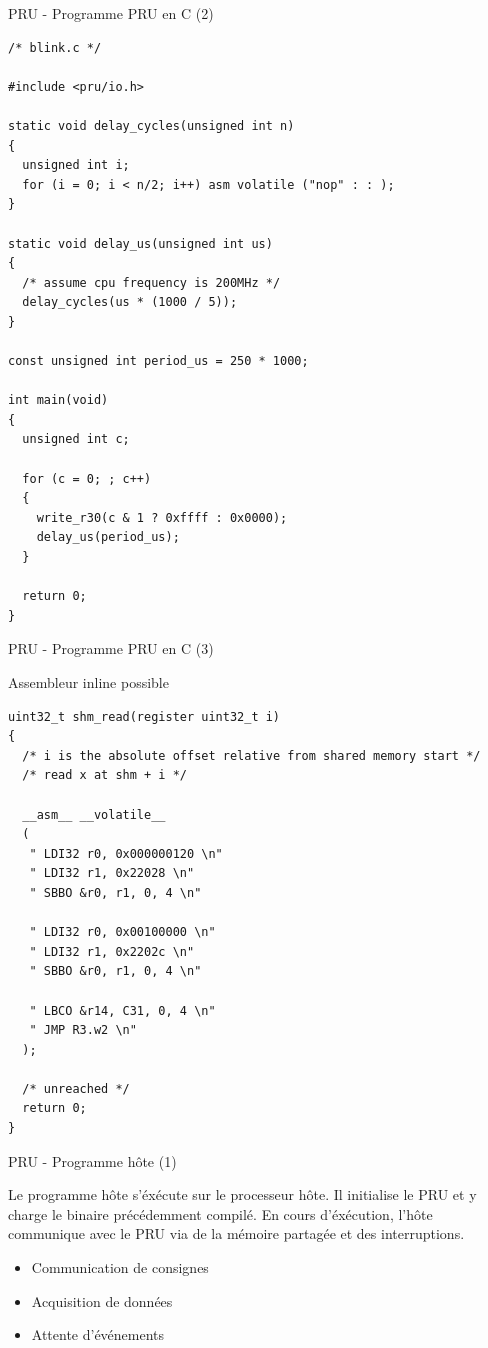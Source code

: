 \documentclass{beamer}
\begin{document}
\begin{frame}[containsverbatim]{PRU - Programme PRU en C (2)}
 \begin{tiny}
   \lstset{language=C++}
   \begin{lstlisting}[frame=tb]
/* blink.c */

#include <pru/io.h>

static void delay_cycles(unsigned int n)
{
  unsigned int i;
  for (i = 0; i < n/2; i++) asm volatile ("nop" : : );
}

static void delay_us(unsigned int us)
{
  /* assume cpu frequency is 200MHz */
  delay_cycles(us * (1000 / 5));
}

const unsigned int period_us = 250 * 1000;

int main(void)
{
  unsigned int c;

  for (c = 0; ; c++)
  {
    write_r30(c & 1 ? 0xffff : 0x0000);
    delay_us(period_us);
  }

  return 0;
}
 \end{lstlisting}
 \end{tiny}
\end{frame}


\begin{frame}[containsverbatim]{PRU - Programme PRU en C (3)}
 \begin{tiny}
   Assembleur inline possible
   \lstset{language=C++}
   \begin{lstlisting}[frame=tb]
uint32_t shm_read(register uint32_t i)
{
  /* i is the absolute offset relative from shared memory start */
  /* read x at shm + i */

  __asm__ __volatile__
  (
   " LDI32 r0, 0x000000120 \n"
   " LDI32 r1, 0x22028 \n"
   " SBBO &r0, r1, 0, 4 \n"

   " LDI32 r0, 0x00100000 \n"
   " LDI32 r1, 0x2202c \n"
   " SBBO &r0, r1, 0, 4 \n"

   " LBCO &r14, C31, 0, 4 \n"
   " JMP R3.w2 \n"
  );

  /* unreached */
  return 0;
}
 \end{lstlisting}
 \end{tiny}
\end{frame}


\begin{frame}{PRU - Programme h\^ote (1)}
  \begin{small}
    Le programme h\^ote s'\'ex\'ecute sur le processeur h\^ote.
    Il initialise le PRU et y charge le binaire pr\'ec\'edemment
    compil\'e. En cours d'\'ex\'ecution, l'h\^ote communique avec
    le PRU via de la m\'emoire partag\'ee et des interruptions.
    \begin{itemize}
    \item Communication de consignes
    \item Acquisition de donn\'ees
    \item Attente d'\'ev\'enements
    \end{itemize}
  \end{small}
\end{frame}
\end{document}
